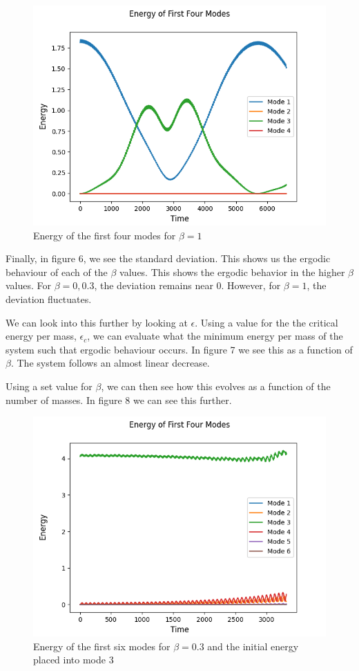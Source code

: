 \documentclass[pra,twocolumn,showpacs,amsmath,amssymb]{revtex4-2}
\begin{document}
\begin{figure}[t!]
\includegraphics[scale=0.50]{Ene4_Beta1.png}
\caption{Energy of the first four modes for $\beta = 1$}\label{autocorr}
\end{figure}

\par Finally, in figure 6, we see the standard deviation. This shows us the ergodic behaviour of each of the $\beta$ values. This shows the ergodic behavior in the higher $\beta$ values. For $\beta = 0, 0.3$, the deviation remains near 0. However, for $\beta = 1$, the deviation fluctuates.
\par We can look into this further by looking at $\epsilon$. Using a value for the the critical energy per mass, $\epsilon_c$, we can evaluate what the minimum energy per mass of the system such that ergodic behaviour occurs. In figure 7 we see this as a function of $\beta$. The system follows an almost linear decrease.
\par Using a set value for $\beta$, we can then see how this evolves as a function of the number of masses. In figure 8 we can see this further.

\begin{figure}[t!]
\includegraphics[scale=0.50]{Ene4_Beta03_Mode3.png}
\caption{Energy of the first six modes for $\beta = 0.3$ and the initial energy placed into mode 3}\label{position}
\end{figure}
\end{document}
